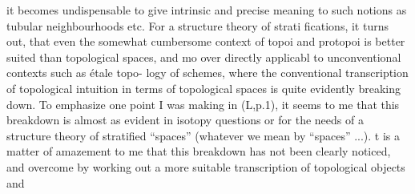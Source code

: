 it becomes undispensable to give intrinsic and precise meaning to such
notions as tubular neighbourhoods etc. For a structure theory of strati
fications, it turns out, that even the somewhat cumbersome context of
topoi and protopoi is better suited than topological spaces, and mo
over directly applicabl to unconventional contexts such as étale topo-%
logy of schemes, where the conventional transcription of topological
intuition in terms of topological spaces is quite evidently breaking
down. To emphasize one point I was making in (L,p.1), it seems to me
that this breakdown is almost as evident in  isotopy questions\hand{,} or
for the needs of a structure theory of stratified ``spaces'' (whatever we
mean by ``spaces'' ...).  t is a matter of amazement to me that this
breakdown has not been clearly noticed, and  overcome by 
working out a more suitable transcription of topological objects and
